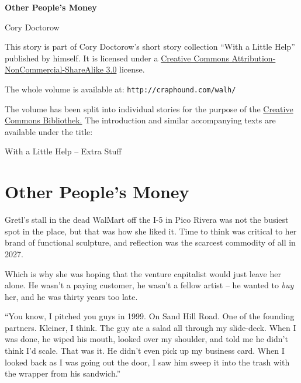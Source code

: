 


\raggedbottom

\begin{center}
\textbf{\huge\textsf{Other People's Money}}

\medskip
Cory Doctorow

\end{center}

\bigskip

\begin{flushleft}
This story is part of Cory Doctorow’s short story collection
“With a Little Help” published by himself. It is licensed under a
\href{http://creativecommons.org/licenses/by-nc-sa/}
{Creative Commons Attribution-NonCommercial-ShareAlike 3.0} license.

\bigskip

The whole volume is available at:
\texttt{http://craphound.com/walh/}

\medskip

The volume has been split into individual stories for the purpose of the
\href{http://ccbib.org}{Creative Commons Bibliothek.}
The introduction and similar accompanying texts are available under the 
title:
\end{flushleft}
\begin{center}
With a Little Help -- Extra Stuff
\end{center}

\newpage

\section{Other People's Money}

Gretl's stall in the dead WalMart off the I-5 in Pico Rivera was not 
the busiest spot in the place, but that was how she liked it. Time to 
think was critical to her brand of functional sculpture, and reflection 
was the scarcest commodity of all in 2027.

Which is why she was hoping that the venture capitalist would just 
leave her alone. He wasn't a paying customer, he wasn't a fellow artist 
-- he wanted to \emph{buy} her, and he was thirty years too late.

“You know, I pitched you guys in 1999. On Sand Hill Road. One of the 
founding partners. Kleiner, I think. The guy ate a salad all through my 
slide-deck. When I was done, he wiped his mouth, looked over my 
shoulder, and told me he didn't think I'd scale. That was it. He didn't 
even pick up my business card. When I looked back as I was going out 
the door, I saw him sweep it into the trash with the wrapper from his 
sandwich.”

